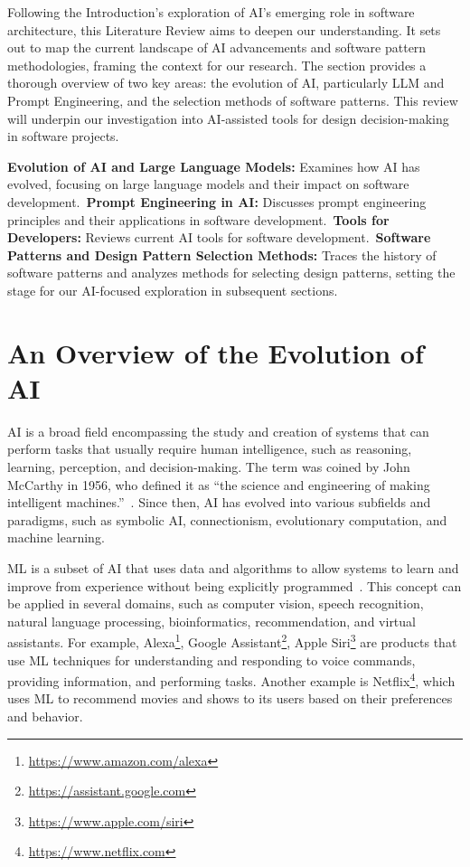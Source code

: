 Following the Introduction's exploration of AI's emerging role in software architecture, this Literature Review aims to deepen our understanding. It sets out to map the current landscape of AI advancements and software pattern methodologies, framing the context for our research. The section provides a thorough overview of two key areas: the evolution of AI, particularly \ac{LLM} and Prompt Engineering, and the selection methods of software patterns. This review will underpin our investigation into AI-assisted tools for design decision-making in software projects.

\textbf{Evolution of AI and Large Language Models:} Examines how AI has evolved, focusing on large language models and their impact on software development.~\textbf{Prompt Engineering in AI:} Discusses prompt engineering principles and their applications in software development.~\textbf{Tools for Developers:} Reviews current AI tools for software development.~\textbf{Software Patterns and Design Pattern Selection Methods:} Traces the history of software patterns and analyzes methods for selecting design patterns, setting the stage for our AI-focused exploration in subsequent sections.

\section{An Overview of the Evolution of AI}\label{sec:AI-evolution}
AI is a broad field encompassing the study and creation of systems that can perform tasks that usually require human intelligence, such as reasoning, learning, perception, and decision-making. The term was coined by John McCarthy in 1956, who defined it as ``the science and engineering of making intelligent machines.''~\cite{Mccarthy2006}. Since then, AI has evolved into various subfields and paradigms, such as symbolic AI, connectionism, evolutionary computation, and machine learning. 

\ac{ML} is a subset of AI that uses data and algorithms to allow systems to learn and improve from experience without being explicitly programmed~\cite{Mitchell2007}. This concept can be applied in several domains, such as computer vision, speech recognition, natural language processing, bioinformatics, recommendation, and virtual assistants. For example, Alexa\footnote{\url{https://www.amazon.com/alexa}}, Google Assistant\footnote{\url{https://assistant.google.com}}, Apple Siri\footnote{\url{https://www.apple.com/siri}} are products that use \ac{ML} techniques for understanding and responding to voice commands, providing information, and performing tasks. Another example is Netflix\footnote{\url{https://www.netflix.com}}, which uses \ac{ML} to recommend movies and shows to its users based on their preferences and behavior.

